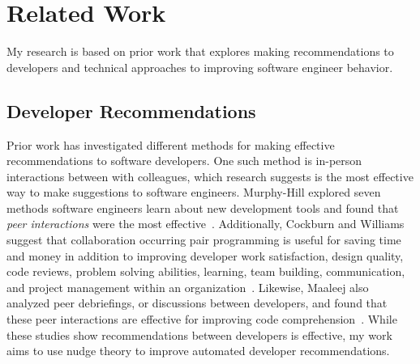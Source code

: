 \section{Related Work}

My research is based on prior work that explores making recommendations to developers and technical approaches to improving software engineer behavior.

\subsection{Developer Recommendations} 

Prior work has investigated different methods for making effective recommendations to software developers. One such method is in-person interactions between with colleagues, which research suggests is the most effective way to make suggestions to software engineers. Murphy-Hill explored seven methods software engineers learn about new development tools and found that \textit{peer interactions} were the most effective~\cite{Murphy-Hill2015HowDoUsers}. Additionally, Cockburn and Williams suggest that collaboration occurring pair programming is useful for saving time and money in addition to improving developer work satisfaction, design quality, code reviews, problem solving abilities, learning, team building, communication, and project management within an  organization~\cite{WilliamsPairProgramming}. Likewise, Maaleej also analyzed peer debriefings, or discussions between developers, and found that these peer interactions are effective for improving code comprehension~\cite{Maalej2014Comprehension}. While these studies show recommendations between developers is effective, my work aims to use nudge theory to improve automated developer recommendations.


